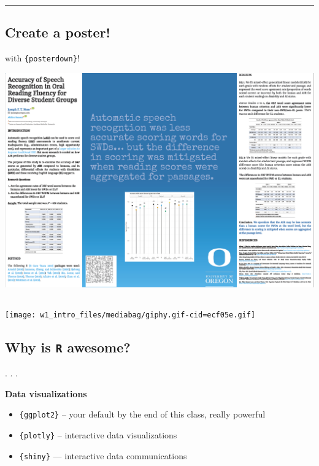 \documentclass[
  letterpaper,
  DIV=11,
  numbers=noendperiod,
  oneside]{scrartcl}
\providecommand{\tightlist}{%
  \setlength{\itemsep}{0pt}\setlength{\parskip}{0pt}}\usepackage{longtable,booktabs,array}
\begin{document}
\begin{center}\rule{0.5\linewidth}{0.5pt}\end{center}

\hypertarget{create-a-poster}{%
\subsection{Create a poster!}\label{create-a-poster}}

with \texttt{\{posterdown\}}!

\includegraphics[width=1\textwidth,height=\textheight]{images/poster_ex.png}

\hypertarget{section}{%
\subsection{}\label{section}}

\texttt{[image: w1\_intro\_files/mediabag/giphy.gif-cid=ecf05e.gif]}

\hypertarget{why-is-r-awesome}{%
\subsection{\texorpdfstring{Why is \texttt{R}
awesome?}{Why is R awesome?}}\label{why-is-r-awesome}}

. . .

\textbf{Data visualizations}

\begin{itemize}
\tightlist
\item
  \texttt{\{ggplot2\}} -- your default by the end of this class, really
  powerful
\item
  \texttt{\{plotly\}} -- interactive data visualizations
\item
  \texttt{\{shiny\}} --- interactive data communications
\end{itemize}
\end{document}

